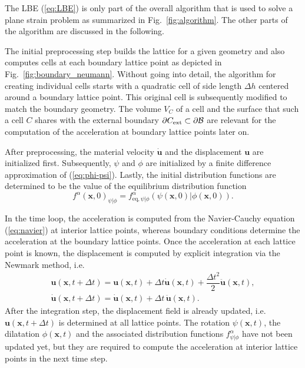 \documentclass{article}
\renewcommand{\vec}{\boldsymbol}        %
\newcommand{\argum}{(\vec{x},t)}
\begin{document}
The LBE (\ref{eq:LBE}) is only part of the overall algorithm that is used to solve a plane strain problem  as summarized in Fig.~\ref{fig:algorithm}. The other parts of the algorithm are discussed in the following.

The initial preprocessing step builds the lattice for a given geometry and also computes cells at each boundary lattice point as depicted in Fig.~\ref{fig:boundary_neumann}. 
Without going into detail, the algorithm for creating individual cells starts with a quadratic cell of side length $\Delta{h}$ centered around a boundary lattice point. This original cell is subsequently modified to match the boundary geometry.
The volume $V_C$ of a cell and the surface that such a cell $C$ shares with the external boundary $\partial{C}_{\text{ext}}\subset{\partial{\cal B}}$ are relevant for the computation of the acceleration at boundary lattice points later on.

After preprocessing, the material velocity $\dot{\boldsymbol{u}}$ and the displacement $\vec{u}$ are initialized first. Subsequently, $\psi$ and $\phi$ are initialized by a finite difference approximation of (\ref{eq:phi-psi}). Lastly,  the initial distribution functions are determined to be the value of the equilibrium distribution function
\begin{equation}
    f^{\alpha}(\vec{x},0)_{\psi\vert\phi} = f^{\alpha}_{\text{eq},\psi\vert\phi}(\psi(\vec{x},0)\vert\phi(\vec{x},0)).
\end{equation}

In the time loop, the acceleration is computed from the Navier-Cauchy equation (\ref{eq:navier}) at interior lattice points, whereas boundary conditions determine the acceleration  at the boundary lattice points. Once the acceleration at each lattice point is known, the displacement is computed by explicit integration via the Newmark method, i.e.
\begin{align}
    \vec{u}(\vec{x}, t+\Delta{t}) = \vec{u}(\vec{x}, t) + \Delta{t}\dot{\vec{u}}\argum + \dfrac{\Delta{t}^2}{2} \ddot{\vec{u}}(\vec{x},t) \nonumber,\\
    \dot{\vec{u}}(\vec{x}, t+\Delta{t}) = \dot{\vec{u}}(\vec{x}, t) + \Delta{t}\,\ddot{\vec{u}}\argum. 
    \label{eq:integration}
\end{align}
After the integration step, the displacement field is already updated, i.e. $\vec{u}(\vec{x}, t+\Delta{t})$ is determined at all lattice points. The rotation $\psi\argum$, the dilatation $\phi\argum$ and the associated distribution functions $f_{\psi\vert\phi}^\alpha$ have not been updated yet, but they are required to compute the acceleration at interior lattice points in the next time step.
\end{document}
